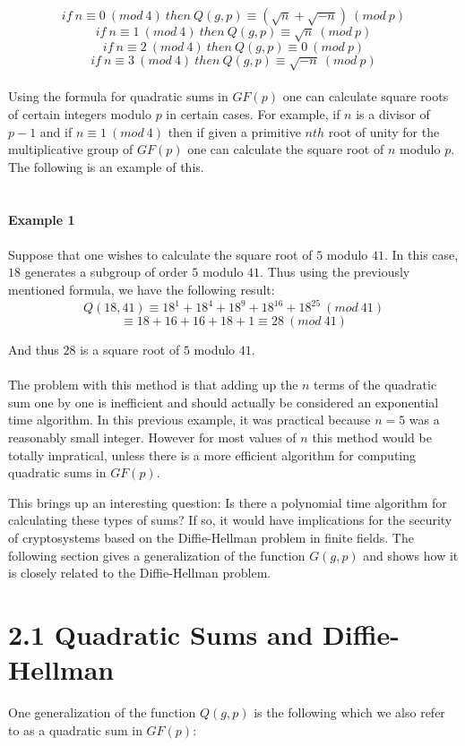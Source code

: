 \documentclass[final,letterpaper,oneside,10pt]{article}
\begin{document}
\[if~ n\equiv0~(mod~4)~then~Q(g,p) \equiv (\sqrt{n}+\sqrt{-n})~(mod~p)\]
\[if~ n\equiv1~(mod~4)~then~Q(g,p) \equiv \sqrt{n}~(mod~ p)\]
\[if~ n\equiv2~(mod~4)~then~Q(g,p) \equiv 0~(mod~ p)\]
\[if~ n\equiv3~(mod~4)~then~Q(g,p) \equiv \sqrt{-n}~(mod~ p)\]
\\

Using the formula for quadratic sums in $GF(p)$ one can calculate square roots of certain integers modulo $p$ in certain cases.
For example, if $n$ is a divisor of $p-1$ and if $n\equiv 1~(mod~4)$ then if given a primitive $nth$ root of unity for the multiplicative 
group of $GF(p)$ one can calculate the square root of $n$ modulo $p$.  The following is an example of this.
\\
\\
\\
\textbf{Example 1}
\\
\\
Suppose that one wishes to calculate the square root of $5$ modulo $41$.  In this case, $18$ generates a subgroup of order $5$
modulo $41$.  Thus using the previously mentioned formula, we have the following result:
\\
\[Q(18,41)\equiv 18^1+18^4+18^9+18^{16}+18^{25}~(mod~41)\]
\[\equiv 18+16+16+18+1\equiv 28~(mod~41)\]

And thus $28$ is a square root of $5$ modulo $41$.
\\
\\
The problem with this method is that adding up the $n$ terms of the quadratic sum one by one is inefficient and should actually be
considered an exponential time algorithm.  In this previous example, it was practical because $n=5$ was a reasonably small integer.
However for most values of $n$ this method would be totally impratical, unless there is a more efficient algorithm for computing
quadratic sums in $GF(p)$.

This brings up an interesting question: Is there a polynomial time algorithm for calculating these types of sums?  If so, it would have
implications for the security of cryptosystems based on the Diffie-Hellman problem in finite fields.  The following section gives a generalization
of the function $G(g,p)$ and shows how it is closely related to the Diffie-Hellman problem.

\section*{2.1 Quadratic Sums and Diffie-Hellman}
One generalization of the function $Q(g,p)$ is the following which we also refer to as a quadratic sum in $GF(p)$:
\end{document}
